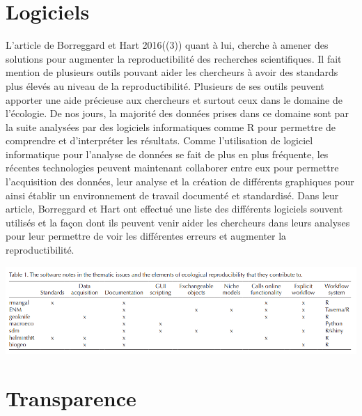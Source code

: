 \documentclass[9pt,twocolumn,twoside,]{pnas-new}
\begin{document}
\hypertarget{logiciels}{%
\section{Logiciels}\label{logiciels}}

L'article de Borreggard et Hart 2016((3)) quant à lui, cherche à amener
des solutions pour augmenter la reproductibilité des recherches
scientifiques. Il fait mention de plusieurs outils pouvant aider les
chercheurs à avoir des standards plus élevés au niveau de la
reproductibilité. Plusieurs de ses outils peuvent apporter une aide
précieuse aux chercheurs et surtout ceux dans le domaine de l'écologie.
De nos jours, la majorité des données prises dans ce domaine sont par la
suite analysées par des logiciels informatiques comme R pour permettre
de comprendre et d'interpréter les résultats. Comme l'utilisation de
logiciel informatique pour l'analyse de données se fait de plus en plus
fréquente, les récentes technologies peuvent maintenant collaborer entre
eux pour permettre l'acquisition des données, leur analyse et la
création de différents graphiques pour ainsi établir un environnement de
travail documenté et standardisé. Dans leur article, Borreggard et Hart
ont effectué une liste des différents logiciels souvent utilisés et la
façon dont ils peuvent venir aider les chercheurs dans leurs analyses
pour leur permettre de voir les différentes erreurs et augmenter la
reproductibilité.

\href{@borregaard2016towards}{\includegraphics{images/Borregaard2016-01.png}}

\hypertarget{transparence}{%
\section{Transparence}\label{transparence}}
\end{document}
